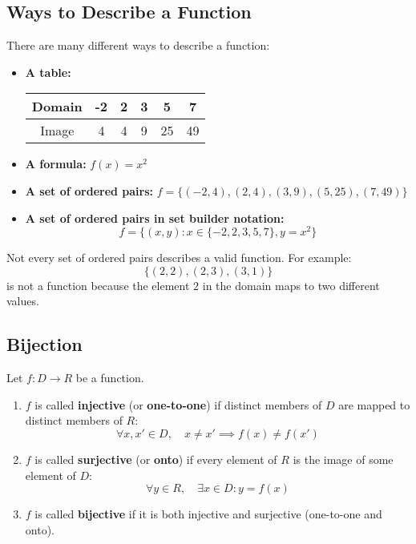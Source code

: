 \subsection{Ways to Describe a Function}

There are many different ways to describe a function:

\begin{itemize}
    \item \textbf{A table:}
    \begin{center}
    \begin{tabular}{|c|c|c|c|c|c|}
        \hline
        Domain & -2 & 2 & 3 & 5 & 7 \\
        \hline
        Image & 4 & 4 & 9 & 25 & 49 \\
        \hline
    \end{tabular}
    \end{center}
    
    \item \textbf{A formula:} $f(x) = x^2$
    
    \item \textbf{A set of ordered pairs:} $f = \{(-2,4), (2,4), (3,9), (5,25), (7,49)\}$
    
    \item \textbf{A set of ordered pairs in set builder notation:}
    \[
        f = \{(x,y) : x \in \{-2, 2, 3, 5, 7\}, y = x^2\}
    \]
\end{itemize}

\begin{note}
    Not every set of ordered pairs describes a valid function. For example:
    \[
        \{(2,2), (2,3), (3,1)\}
    \]
    is not a function because the element $2$ in the domain maps to two different values.
\end{note}

\subsection{Bijection}

\begin{definition}\label{def:bijection}
    Let $f: D \to R$ be a function.
    \begin{enumerate}[label=(\roman*)]
        \item $f$ is called \textbf{injective} (or \textbf{one-to-one}) if distinct members of $D$ are mapped to distinct members of $R$:
        \[
            \forall x, x' \in D, \quad x \neq x' \implies f(x) \neq f(x')
        \]
        
        \item $f$ is called \textbf{surjective} (or \textbf{onto}) if every element of $R$ is the image of some element of $D$:
        \[
            \forall y \in R, \quad \exists x \in D : y = f(x)
        \]
        
        \item $f$ is called \textbf{bijective} if it is both injective and surjective (one-to-one and onto).
    \end{enumerate}
\end{definition}

